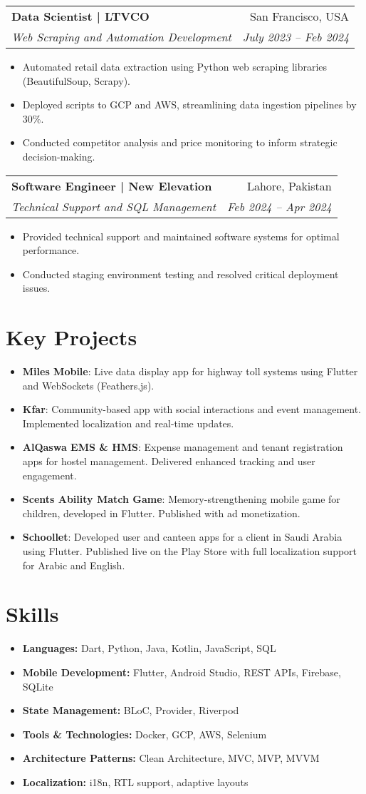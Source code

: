 \documentclass[a4paper,10pt]{article}
\makeatletter
\newcommand{\resumeSubheading}[4]{
  \vspace{-1pt}\item
    \begin{tabular*}{0.97\textwidth}[t]{l@{\extracolsep{\fill}}r}
      \textbf{#1} & #2 \\
      \textit{\small#3} & \textit{\small#4} \\
    \end{tabular*}\vspace{-5pt}
}
\newcommand{\resumeProject}[2]{
  \item\small{
    \textbf{#1}{: #2}
  }
}
\newcommand{\resumeSkills}[2]{
  \item\small{
    \textbf{#1:} #2
  }
}
\makeatother
\begin{document}
\resumeSubheading
{Data Scientist | LTVCO}{San Francisco, USA}
{Web Scraping and Automation Development}{July 2023 -- Feb 2024}
\begin{itemize}[leftmargin=*]
  \item Automated retail data extraction using Python web scraping libraries (BeautifulSoup, Scrapy).
  \item Deployed scripts to GCP and AWS, streamlining data ingestion pipelines by 30\%.
  \item Conducted competitor analysis and price monitoring to inform strategic decision-making.
\end{itemize}

\resumeSubheading
{Software Engineer | New Elevation}{Lahore, Pakistan}
{Technical Support and SQL Management}{Feb 2024 -- Apr 2024}
\begin{itemize}[leftmargin=*]
  \item Provided technical support and maintained software systems for optimal performance.
  \item Conducted staging environment testing and resolved critical deployment issues.
\end{itemize}

\section{Key Projects}
\begin{itemize}[leftmargin=*]
  \resumeProject{Miles Mobile}
  {Live data display app for highway toll systems using Flutter and WebSockets (Feathers.js).}
  \resumeProject{Kfar}
  {Community-based app with social interactions and event management. Implemented localization and real-time updates.}
  \resumeProject{AlQaswa EMS \& HMS}
  {Expense management and tenant registration apps for hostel management. Delivered enhanced tracking and user engagement.}
  \resumeProject{Scents Ability Match Game}
  {Memory-strengthening mobile game for children, developed in Flutter. Published with ad monetization.}
  \resumeProject{Schoollet}
  {Developed user and canteen apps for a client in Saudi Arabia using Flutter. Published live on the Play Store with full localization support for Arabic and English.}
\end{itemize}

\section{Skills}
\begin{multicols}{2}
\begin{itemize}[leftmargin=*]
  \resumeSkills{Languages}{Dart, Python, Java, Kotlin, JavaScript, SQL}
  \resumeSkills{Mobile Development}{Flutter, Android Studio, REST APIs, Firebase, SQLite}
  \resumeSkills{State Management}{BLoC, Provider, Riverpod}
  \resumeSkills{Tools \& Technologies}{Docker, GCP, AWS, Selenium}
  \resumeSkills{Architecture Patterns}{Clean Architecture, MVC, MVP, MVVM}
  \resumeSkills{Localization}{i18n, RTL support, adaptive layouts}
\end{itemize}
\end{multicols}
\end{document}
